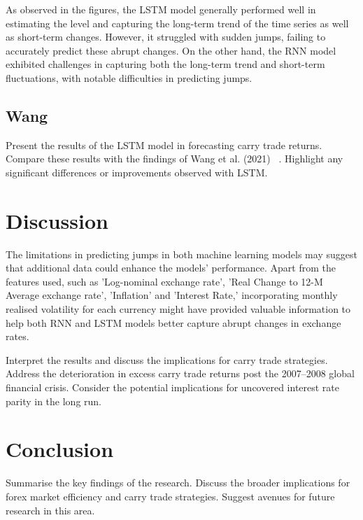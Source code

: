\documentclass[a4paper,10pt]{article}
\begin{document}
As observed in the figures, the LSTM model generally performed well in estimating the level and capturing the long-term trend of the time series as well as short-term changes. However, it struggled with sudden jumps, failing to accurately predict these abrupt changes. On the other hand, the RNN model exhibited challenges in capturing both the long-term trend and short-term fluctuations, with notable difficulties in predicting jumps.



\subsection{Wang}

Present the results of the LSTM model in forecasting carry trade returns.
Compare these results with the findings of Wang et al. (2021) ~\cite{wang2021machine}.
Highlight any significant differences or improvements observed with LSTM.

\section{Discussion}

The limitations in predicting jumps in both machine learning models may suggest that additional data could enhance the models' performance. Apart from the features used, such as 'Log-nominal exchange rate', 'Real Change to 12-M Average exchange rate', 'Inflation' and 'Interest Rate,' incorporating monthly realised volatility for each currency might have provided valuable information to help both RNN and LSTM models better capture abrupt changes in exchange rates.

Interpret the results and discuss the implications for carry trade strategies.
Address the deterioration in excess carry trade returns post the 2007–2008 global financial crisis.
Consider the potential implications for uncovered interest rate parity in the long run.

\section{Conclusion}
Summarise the key findings of the research.
Discuss the broader implications for forex market efficiency and carry trade strategies.
Suggest avenues for future research in this area.




\appendix
\end{document}
